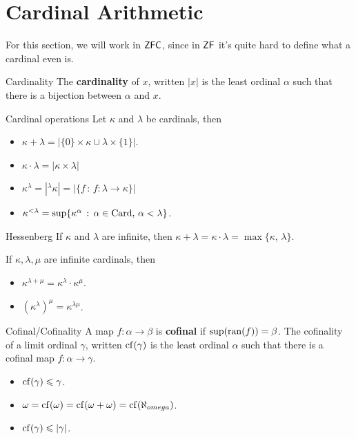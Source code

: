 \documentclass{article}
\begin{document}
\section{Cardinal Arithmetic}
For this section, we will work in $\mathsf{ZFC}$, since in $\mathsf{ZF}$ it's quite hard to define what a cardinal even is.
\begin{fancydefine}{Cardinality}
    The \textbf{cardinality} of $x$, written $|x|$ is the least ordinal $\alpha$ such that there is a bijection between $\alpha$ and $x$.
\end{fancydefine}
\begin{fancydefine}{Cardinal operations}
    Let $\kappa$ and $\lambda$ be cardinals, then \begin{itemize}
        \item $\kappa + \lambda = |\{0\} \times \kappa \cup \lambda \times \{1\}|$.
        \item $\kappa \cdot \lambda = |\kappa \times \lambda|$
        \item $\kappa^{\lambda} = |^{\lambda}\kappa| = |\{f \, : \, f: \lambda \to \kappa\}|$
        \item $\kappa^{<\lambda} = \sup\{\kappa^{\alpha} \, : \, \alpha \in \operatorname{Card}, \, \alpha< \lambda\}$.
    \end{itemize}
\end{fancydefine}
\begin{fancythm}{Hessenberg}
    If $\kappa$ and $\lambda$ are infinite, then $\kappa+ \lambda = \kappa \cdot \lambda = \max\{\kappa, \, \lambda\}$.
\end{fancythm}
\begin{fancylem}{}
    If $\kappa, \lambda, \mu$ are infinite cardinals, then \begin{itemize}
        \item $\kappa^{\lambda + \mu} = \kappa^{\lambda} \cdot \kappa^{\mu}$.
        \item $\left(\kappa^{\lambda}\right)^{\mu} = \kappa^{\lambda \mu}$.
    \end{itemize}
\end{fancylem}
\begin{fancydefine}{Cofinal/Cofinality}
    A map $f: \alpha \to \beta$ is \textbf{cofinal} if $\sup(\operatorname{ran}(f)) =\beta$. The cofinality of a limit ordinal $\gamma$, written $\operatorname{cf}(\gamma)$ is the least ordinal $\alpha$ such that there is a cofinal map $f: \alpha \to \gamma$.
\end{fancydefine}
\begin{remark*}\hspace{0.1cm}
    \begin{itemize}
        \item $\operatorname{cf}(\gamma) \leqslant \gamma$.
        \item $\omega = \operatorname{cf}(\omega) = \operatorname{cf}(\omega + \omega) = \operatorname{cf}(\aleph_{omega})$.
        \item $\operatorname{cf}(\gamma) \leqslant |\gamma|$.
    \end{itemize}
\end{remark*}
\end{document}
